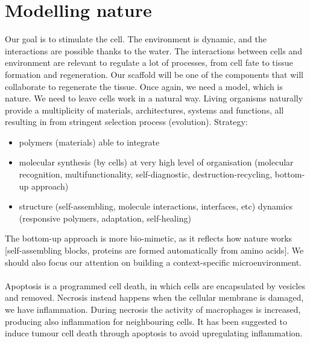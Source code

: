 \section{Modelling nature}
Our goal is to stimulate the cell.
The environment is dynamic, and the interactions are possible thanks to the water.
The interactions between cells and environment are relevant to regulate a lot of processes, from cell fate to tissue formation and regeneration.
Our scaffold will be one of the components that will collaborate to regenerate the tissue.
Once again, we need a model, which is nature.
We need to leave cells work in a natural way.
Living organisms naturally provide a multiplicity of materials, architectures, systems and functions, all resulting in from stringent selection process (evolution).
\noindent
Strategy:
\begin{itemize}
\item polymers (materials) able to integrate
\item molecular synthesis (by cells) at very high level of organisation (molecular recognition, multifunctionality, self-diagnostic, destruction-recycling, bottom-up approach)
\item structure (self-assembling, molecule interactions, interfaces, etc) dynamics
(responsive polymers, adaptation, self-healing)
\end{itemize}
\noindent
The bottom-up approach is more bio-mimetic,  as it reflects how nature works [self-assembling blocks, proteins are formed automatically from amino acids].
We should also focus our attention on building a context-specific microenvironment.
\\
\\
\noindent
Apoptosis is a programmed cell death, in which cells are encapsulated by vesicles and removed.
Necrosis instead happens when the cellular membrane is damaged, we have inflammation.
During necrosis the activity of macrophages is increased, producing also inflammation for neighbouring cells.
It has been suggested to induce tumour cell death through apoptosis to avoid upregulating inflammation.
